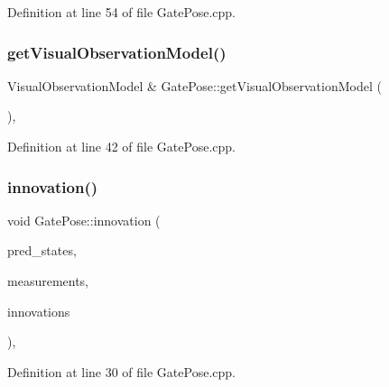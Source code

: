 Definition at line 54 of file Gate\+Pose.\+cpp.

\mbox{\label{classGatePose_aa47f9242f039b8752675db5594350a28}} 
\subsubsection{\texorpdfstring{get\+Visual\+Observation\+Model()}{getVisualObservationModel()}}
{\footnotesize\ttfamily Visual\+Observation\+Model \& Gate\+Pose\+::get\+Visual\+Observation\+Model (\begin{DoxyParamCaption}{ }\end{DoxyParamCaption})\hspace{0.3cm}{\ttfamily [override]}, {\ttfamily [inherited]}}



Definition at line 42 of file Gate\+Pose.\+cpp.

\mbox{\label{classGatePose_a00607a4325dcfb7a02bda7490b65d25c}} 
\subsubsection{\texorpdfstring{innovation()}{innovation()}}
{\footnotesize\ttfamily void Gate\+Pose\+::innovation (\begin{DoxyParamCaption}\item[{const Eigen\+::\+Ref$<$ const Eigen\+::\+Matrix\+Xf $>$ \&}]{pred\+\_\+states,  }\item[{cv\+::\+Input\+Array}]{measurements,  }\item[{Eigen\+::\+Ref$<$ Eigen\+::\+Matrix\+Xf $>$}]{innovations }\end{DoxyParamCaption})\hspace{0.3cm}{\ttfamily [override]}, {\ttfamily [inherited]}}



Definition at line 30 of file Gate\+Pose.\+cpp.

\mbox{\label{classGatePose_ad2e8708b3ed5a8252bdec1494f199fda}} 

